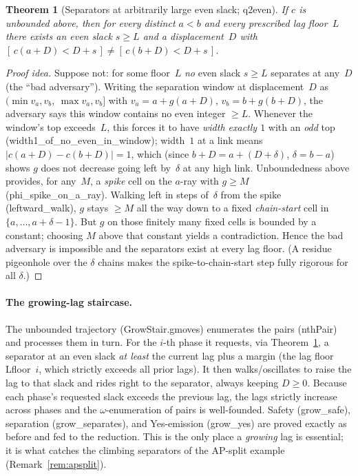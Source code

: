 \documentclass{article}
\newtheorem{theorem}{Theorem}[section]
\newcommand{\us}{\discretionary{}{}{}\_\discretionary{}{}{}}
\newcommand{\dt}{.\discretionary{}{}{}}
\newcommand{\lean}[1]{{\small\ttfamily #1}}
\begin{document}
\begin{theorem}[Separators at arbitrarily large even slack;
  \lean{q2even}]\label{thm:q2even}
If $c$ is unbounded above, then for every distinct $a<b$ and every
prescribed lag floor~$L$ there exists an \emph{even} slack $s\ge L$ and a
displacement~$D$ with $[\,c(a{+}D)<D{+}s\,]\neq[\,c(b{+}D)<D{+}s\,]$.
\end{theorem}
\begin{proof}[Proof idea]
Suppose not: for some floor~$L$ \emph{no} even slack $s\ge L$ separates at
any~$D$ (the ``bad adversary''). Writing the separation window at
displacement~$D$ as $(\min v_a,v_b,\ \max v_a,v_b]$ with $v_a=a+g(a{+}D)$,
$v_b=b+g(b{+}D)$, the adversary says this window contains no even integer
$\ge L$. Whenever the window's top exceeds~$L$, this forces it to have
\emph{width exactly $1$} with an \emph{odd} top
(\lean{width1\us of\us no\us even\us in\us window}); width~$1$ at a link
means $|c(a{+}D)-c(b{+}D)|=1$, which (since $b{+}D=a{+}(D{+}\delta)$,
$\delta=b-a$) shows $g$ does not decrease going left by~$\delta$ at any
high link. Unboundedness above provides, for any~$M$, a \emph{spike} cell
on the $a$-ray with $g\ge M$ (\lean{phi\us spike\us on\us a\us ray}).
Walking left in steps of~$\delta$ from the spike
(\lean{leftward\us walk}), $g$ stays $\ge M$ all the way down to a fixed
\emph{chain-start} cell in $\{a,\dots,a{+}\delta{-}1\}$. But $g$ on those
finitely many fixed cells is bounded by a constant; choosing $M$ above
that constant yields a contradiction. Hence the bad adversary is
impossible and the separators exist at every lag floor. (A residue
pigeonhole over the $\delta$ chains makes the spike-to-chain-start step
fully rigorous for all $\delta$.)
\end{proof}

\paragraph{The growing-lag staircase.}
The unbounded trajectory (\lean{GrowStair\dt gmoves}) enumerates the
pairs (\lean{nthPair}) and processes them in turn. For the $i$-th phase it
requests, via Theorem~\ref{thm:q2even}, a separator at an even slack
\emph{at least} the current lag plus a margin (the lag floor
\lean{Lfloor}~$i$, which strictly exceeds all prior lags). It then
walks/oscillates to raise the lag to that slack and rides right to the
separator, always keeping $D\ge 0$. Because each phase's requested slack
exceeds the previous lag, the lags strictly increase across phases and the
$\omega$-enumeration of pairs is well-founded. Safety
(\lean{grow\us safe}), separation (\lean{grow\us separates}), and
Yes-emission (\lean{grow\us yes}) are proved exactly as before and fed to
the reduction. This is the only place a \emph{growing} lag is essential;
it is what catches the climbing separators of the AP-split example
(Remark~\ref{rem:apsplit}).
\end{document}
